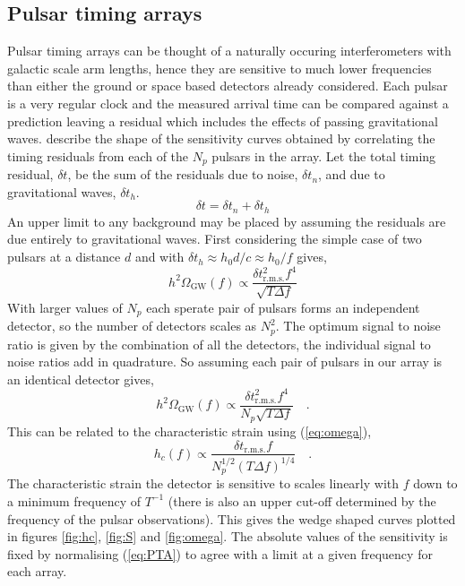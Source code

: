 \subsection{Pulsar timing arrays}
Pulsar timing arrays can be thought of a naturally occuring interferometers with galactic scale arm lengths, hence they are sensitive to much lower frequencies than either the ground or space based detectors already considered.
Each pulsar is a very regular clock and the measured arrival time can be compared against a prediction leaving a residual which includes the effects of passing gravitational waves. \cite{SesanaVecchioColancino} describe the shape of the sensitivity curves obtained by correlating the timing residuals from each of the $N_{p}$ pulsars in the array. Let the total timing residual, $\delta t$, be the sum of the residuals due to noise, $\delta t _{n}$, and due to gravitational waves, $\delta t_{h}$.
\begin{equation} \delta t= \delta t_{n} + \delta t _{h} \end{equation}
An upper limit to any background may be placed by assuming the residuals are due entirely to gravitational waves. First considering the simple case of two pulsars at a distance $d$ and with $\delta t_{h}\approx h_{0}d/c\approx h_{0}/f$ gives,
\begin{equation} h^{2}\Omega_{\textrm{GW}}(f) \propto \frac{\delta t^{2}_{\textrm{r.m.s.}}f^{4}}{\sqrt{T\Delta f}} \end{equation}
With larger values of $N_{p}$ each sperate pair of pulsars forms an independent detector, so the number of detectors scales as $N_{p}^{2}$. The optimum signal to noise ratio is given by the combination of all the detectors, the individual signal to noise ratios add in quadrature. So assuming each pair of pulsars in our array is an identical detector gives,
\begin{equation} h^{2}\Omega_{\textrm{GW}}(f) \propto \frac{\delta t^{2}_{\textrm{r.m.s.}}f^{4}}{N_{p}\sqrt{T\Delta f}} \quad . \end{equation}
This can be related to the characteristic strain using (\ref{eq:omega}),
\begin{equation}\label{eq:PTA} h_{c}(f) \propto \frac{\delta t_{\textrm{r.m.s.}}f}{N_{p}^{1/2}\left( T\Delta f \right)^{1/4}} \quad . \end{equation}
The characteristic strain the detector is sensitive to scales linearly with $f$ down to a minimum frequency of $T^{-1}$ (there is also an upper cut-off determined by the frequency of the pulsar observations). This gives the wedge shaped curves plotted in figures \ref{fig:hc}, \ref{fig:S} and \ref{fig:omega}. The absolute values of the sensitivity is fixed by normalising (\ref{eq:PTA}) to agree with a limit at a given frequency for each array.

